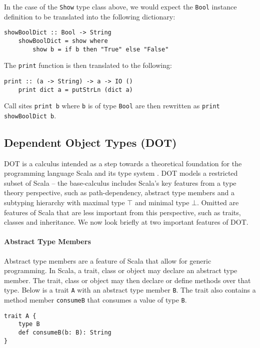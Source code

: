 In the case of the \texttt{Show} type class above, we would expect the
\texttt{Bool} instance definition to be translated into the following
dictionary:
\begin{lstlisting}[mathescape]
    showBoolDict :: Bool -> String
    showBoolDict = show where
        show b = if b then "True" else "False"
\end{lstlisting}

\noindent The \texttt{print} function is then translated to the following:
\begin{lstlisting}[mathescape]
    print :: (a -> String) -> a -> IO ()
    print dict a = putStrLn (dict a)
\end{lstlisting}

\noindent Call sites \texttt{print b} where \texttt{b} is of type \texttt{Bool}
are then rewritten as \texttt{print showBoolDict b}.

\subsection{Dependent Object Types (DOT)}
DOT is a calculus intended as a step towards a theoretical foundation for the
programming language Scala and its type system \cite{AMO12}. DOT models a
restricted subset of Scala -- the base-calculus includes Scala's key features
from a type theory perspective, such as path-dependency, abstract type members
and a subtyping hierarchy with maximal type $\top$ and minimal type $\bot$.
Omitted are features of Scala that are less important from this perspective,
such as traits, classes and inheritance. We now look briefly at two important
features of DOT.

\paragraph{Abstract Type Members}
Abstract type members are a feature of Scala that allow for generic programming.
In Scala, a trait, class or object may declare an abstract type member. The
trait, class or object may then declare or define methods over that type. Below
is a trait \texttt{A} with an abstract type member \texttt{B}. The trait also
contains a method member \texttt{consumeB} that consumes a value of type
\texttt{B}.

\begin{minipage}{\linewidth}
\begin{lstlisting}[mathescape]
trait A {
    type B
    def consumeB(b: B): String
}
\end{lstlisting}
\end{minipage}

